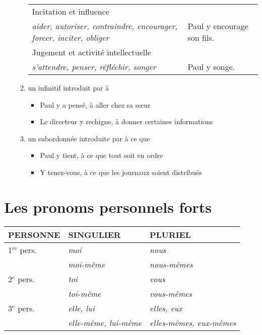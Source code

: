 \documentclass[UTF8]{report}
\begin{document}
\begin{enumerate}
\begin{enumerate}
\begin{table}[H]
\begin{tabular}{|>{\RaggedRight\arraybackslash}p{8cm}|>{\RaggedRight\arraybackslash}p{5cm}|}
    Incitation et influence & \\
    \textit{aider, autoriser, contraindre, encourager, forcer, inciter, obliger} & Paul y encourage son fils. \\
    \hline

    Jugement et activité intellectuelle & \\
    \textit{s'attendre, penser, réfléchir, songer} & Paul y songe. \\
    \hline
    \end{tabular}


    \end{table}
        \item un infinitif introduit par à
    \begin{itemize}
        \item Paul y a pensé, à aller chez sa sœur
        \item Le directeur y rechigne, à donner certaines informations
    \end{itemize}
    \item un subordonnée introduite par à ce que
    \begin{itemize}
        \item Paul y tient, à ce que tout soit en ordre
        \item Y tenez-vous, à ce que les journaux soient distribués 
    \end{itemize}
    
    \end{enumerate}
\end{enumerate}

\section{Les pronoms personnels forts}
\begin{table}[H]
\centering
\begin{tabular}{|l|l|l|}
\hline
\rowcolor{cyan!20}
\textbf{PERSONNE} & \textbf{SINGULIER} & \textbf{PLURIEL} \\
\hline
1$^{\text{re}}$ pers. & \textit{moi} & \textit{nous} \\
\cline{2-3}
& \textit{moi-même} & \textit{nous-mêmes} \\
\hline
2$^{\text{e}}$ pers. & \textit{toi} & \textit{vous} \\
\cline{2-3}
& \textit{toi-même} & \textit{vous-mêmes} \\
\hline
3$^{\text{e}}$ pers. & \textit{elle, lui} & \textit{elles, eux} \\
\cline{2-3}
& \textit{elle-même, lui-même} & \textit{elles-mêmes, eux-mêmes} \\
\hline
\end{tabular}
\end{table}
\end{document}
